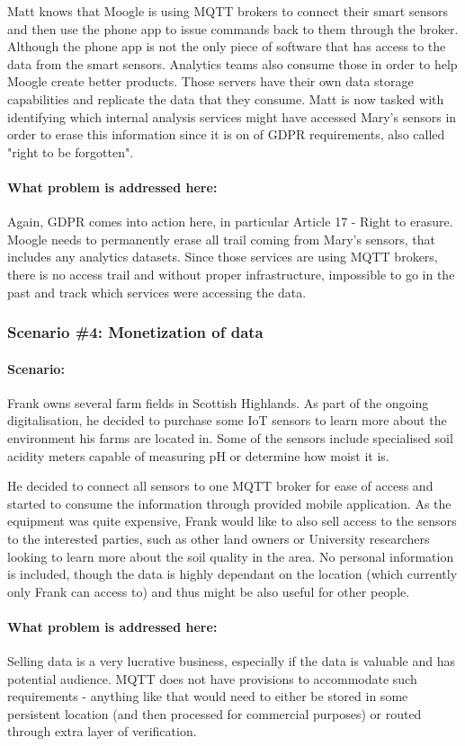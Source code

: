 Matt knows that Moogle is using MQTT brokers to connect their smart sensors and then use the phone app to issue commands back to them through the broker. Although the phone app is not the only piece of software that has access to the data from the smart sensors. Analytics teams also consume those in order to help Moogle create better products. Those servers have their own data storage capabilities and replicate the data that they consume. Matt is now tasked with identifying which internal analysis services might have accessed Mary's sensors in order to erase this information since it is on of GDPR requirements, also called "right to be forgotten".
\paragraph{\textbf{What problem is addressed here:}}
Again, GDPR comes into action here, in particular Article 17 - Right to erasure. Moogle needs to permanently erase all trail coming from Mary's sensors, that includes any analytics datasets. Since those services are using MQTT brokers, there is no access trail and without proper infrastructure, impossible to go in the past and track which services were accessing the data.
\\
\subsubsection{Scenario \#4: Monetization of data}
\paragraph{\textbf{Scenario:}}
Frank owns several farm fields in Scottish Highlands. As part of the ongoing digitalisation, he decided to purchase some IoT sensors to learn more about the environment his farms are located in. Some of the sensors include specialised soil acidity meters capable of measuring pH or determine how moist it is.

He decided to connect all sensors to one MQTT broker for ease of access and started to consume the information through provided mobile application. As the equipment was quite expensive, Frank would like to also sell access to the sensors to the interested parties, such as other land owners or University researchers looking to learn more about the soil quality in the area. No personal information is included, though the data is highly dependant on the location (which currently only Frank can access to) and thus might be also useful for other people. 
\paragraph{\textbf{What problem is addressed here:}}
Selling data is a very lucrative business, especially if the data is valuable and has potential audience. MQTT does not have provisions to accommodate such requirements - anything like that would need to either be stored in some persistent location (and then processed for commercial purposes) or routed through extra layer of verification.
\\
